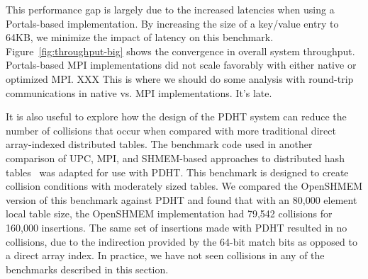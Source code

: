 This performance gap is largely due to the increased latencies when using a
Portals-based implementation. By increasing the size of a key/value entry to
64KB, we minimize the impact of latency on this benchmark.
Figure~\ref{fig:throughput-big} shows the convergence in overall system
throughput. Portals-based MPI implementations did not scale favorably with
either native or optimized MPI. XXX This is where we should do some 
analysis with round-trip communications in native vs. MPI implementations. It's late.



It is also useful to explore how the design of the PDHT system can reduce the
number of collisions that occur when compared with  more traditional direct
array-indexed distributed tables. The benchmark code used in another comparison
of UPC, MPI, and SHMEM-based approaches to distributed hash
tables~\cite{maynard:12} was adapted for use with PDHT. This benchmark is
designed to create collision conditions with moderately sized tables. We
compared the OpenSHMEM version of this benchmark against PDHT and found that
with an 80,000 element local table size, the OpenSHMEM implementation had
79,542 collisions for 160,000 insertions. The same set of insertions made with
PDHT resulted in no collisions, due to the indirection provided by the
64-bit match bits as opposed to a direct array index. In practice, we have
not seen collisions in any of the benchmarks described in this section.








